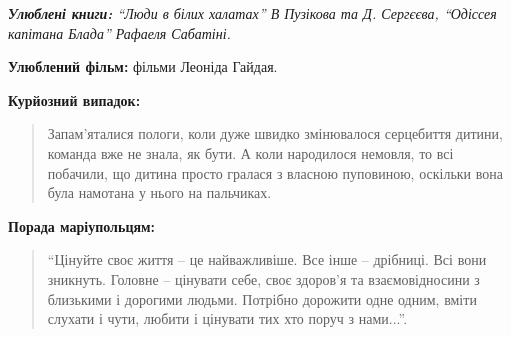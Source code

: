 \begingroup
\em
\textbf{Улюблені книги:} \enquote{Люди в білих халатах} В Пузікова та Д. Сергєєва, \enquote{Одіссея капітана Блада} Рафаеля Сабатіні.

\textbf{Улюблений фільм:} фільми Леоніда Гайдая.

\textbf{Курйозний випадок:}

\begin{quote}
Запам'яталися пологи, коли дуже швидко змінювалося серцебиття дитини, команда
вже не знала, як бути. А коли народилося немовля, то всі побачили, що дитина
просто гралася з власною пуповиною, оскільки вона була намотана у нього на
пальчиках.
\end{quote}

\textbf{Порада маріупольцям:}

\begin{quote}
\enquote{Цінуйте своє життя – це найважливіше. Все інше – дрібниці. Всі вони зникнуть.
Головне – цінувати себе, своє здоров'я та взаємовідносини з близькими і
дорогими людьми. Потрібно дорожити одне одним, вміти слухати і чути, любити і
цінувати тих хто поруч з нами...}.
\end{quote}
	
\endgroup
